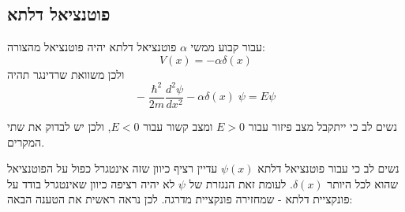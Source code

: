 \documentclass{tstextbook}
\begin{document}
\subsection{פוטנציאל דלתא}

\begin{definition}
עבור קבוע ממשי \(\alpha\) פוטנציאל דלתא יהיה פוטנציאל מהצורה:
$$V(x)=-\alpha \delta(x)$$
ולכן משוואת שרדינגר תהיה
$$-\;\frac{\hbar^{2}}{2m}\frac{d^{2}\psi}{d x^{2}}-\alpha\delta(x)\;\psi=E\psi$$

\end{definition}
נשים לב כי ייתקבל מצב פיזור עבור \(E>0\) ומצב קשור עבור \(E<0\), ולכן יש לבדוק את שתי המקרים.

נשים לב כי עבור פוטנציאל דלתא \(\psi(x)\) עדיין רציף כיוון שזה אינטגרל כפול על הפוטנציאל שהוא לכל היותר \(\delta(x)\). לעומת זאת הנגזרת של \(\psi\) לא יהיה רציפה כיוון שאינטגרל בודד על פונקציית דלתא - שמחזירה פונקציית מדרגה. לכן נראה ראשית את הטענה הבאה:
\end{document}
